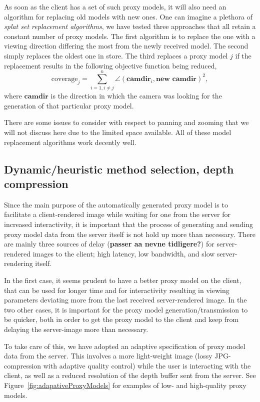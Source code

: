 As soon as the client has a set of such proxy models, it will also need an
algorithm for replacing old models with new ones.  One can imagine a plethora of
{\em splat set replacement algorithms}, we have tested three approaches that all
retain a constant number of proxy models. The first algorithm is to replace the
one with a viewing direction differing the most from the newly received
model. The second simply replaces the oldest one in store. The third replaces a
proxy model $j$ if the replacement results in the following objective function
being reduced,
\[
  \text{coverage}_j = 
  \sum_{i=1, i\neq j}^n 
    \angle(\textbf{camdir}_i, \textbf{new camdir} )^2,
\]
where $\textbf{camdir}$ is the direction in which the camera was looking for the
generation of that particular proxy model.

There are some issues to consider with respect to panning and zooming that we
will not discuss here due to the limited space available.  All of these model
replacement algorithms work decently well.



\subsection{Dynamic/heuristic method selection, depth compression}

Since the main purpose of the automatically generated proxy model is to
facilitate a client-rendered image while waiting for one from the server for
increased interactivity, it is important that the process of generating and
sending proxy model data from the server itself is not hold up more than
necessary. There are mainly three sources of delay (\textbf{passer aa nevne
tidligere?}) for server-rendered images to the client; high
latency, low bandwidth, and slow server-rendering itself.

In the first case, it seems prudent to have a better proxy model on the client,
that can be used for longer time and for interactivity resulting in viewing
parameters deviating more from the last received server-rendered image. In the
two other cases, it is important for the proxy model generation/transmission to
be quicker, both in order to get the proxy model to the client and keep from
delaying the server-image more than necessary.

To take care of this, we have adopted an adaptive specification of
proxy model data from the server. This involves a more light-weight image (lossy
JPG-compression with adaptive quality control) while the user is interacting
with the client, as well as a reduced resolution of the depth buffer sent from
the server. See Figure~\ref{fig:adapativeProxyModels} for examples of low- and
high-quality proxy models.

